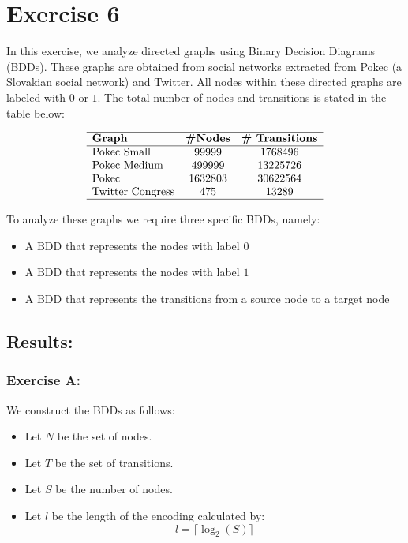 \section{Exercise 6}

    In this exercise, we analyze directed graphs using Binary Decision Diagrams
    (BDDs). These graphs are obtained from social networks extracted from Pokec
    (a Slovakian social network) and Twitter. All nodes within these directed
    graphs are labeled with $0$ or $1$. The total number of nodes and
    transitions is stated in the table below:

    $$ 
    \begin{array}{lcc} \hline \textbf{Graph} & \textbf{\#Nodes} &
        \textbf{\# Transitions} \\ \hline 
    \text{Pokec Small} & 99999 & 1768496 \\ 
    \text{Pokec Medium} & 499999 & 13225726\\ 
    \text{Pokec} & 1632803 & 30622564 \\ 
    \text{Twitter Congress} &  475 & 13289 \\ \hline 
    \end{array}
    $$

    To analyze these graphs we require three specific BDDs, namely:

    \begin{itemize}
        \item A BDD that represents the nodes with label $0$
        \item A BDD that represents the nodes with label $1$
        \item A BDD that represents the transitions from a source node to a
            target node
    \end{itemize}

    \subsection{Results:}
        
        \subsubsection{Exercise A:}
            We construct the BDDs as follows:

            \begin{itemize}
                \item Let $N$ be the set of nodes.
                \item Let $T$ be the set of transitions.
                \item Let $S$ be the number of nodes.
                \item Let $l$ be the length of the encoding calculated by:
                \[
                l = \lceil \log_2(S) \rceil
                \]
            \end{itemize}

